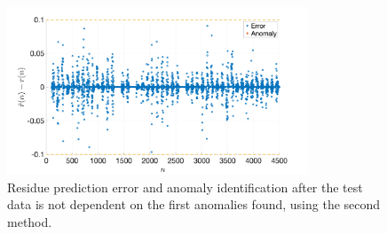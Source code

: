 \documentclass[a4paper, oneside, 11pt]{article}
\begin{document}
\begin{figure}[htbp]
	\centering
	\includegraphics[width= 0.8\textwidth]{figures/R2c_error_an_after_m2.png}
	\caption{Residue prediction error and anomaly identification after the test data is not dependent on the first anomalies found, using the second method.}
	\label{fig:R2c_error_an_after_m2}
\end{figure}
\end{document}
